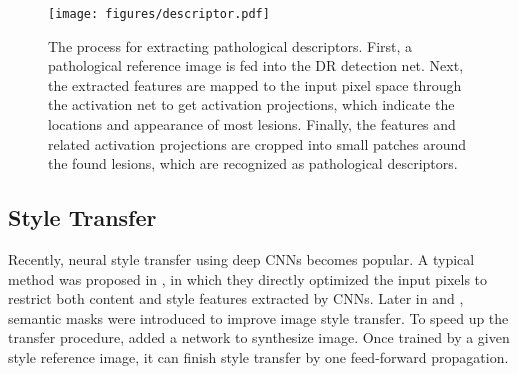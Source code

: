 \documentclass[letterpaper]{article} %
\begin{document}
    		\begin{figure*}[h!]
		\begin{center}
			\texttt{[image: figures/descriptor.pdf]}
		\end{center}
		\caption{The process for extracting pathological descriptors. First, a pathological reference image is fed into the DR detection net. Next, the extracted features are mapped to the input pixel space through the activation net to get activation projections, which indicate the locations and appearance of most lesions. Finally, the features and related activation projections are cropped into small patches around the found lesions, which are recognized as pathological descriptors. }
		\label{fig:descriptor}
	\end{figure*}



	\subsection{Style Transfer}
    Recently, neural style transfer using deep CNNs becomes popular. A typical method was proposed in \cite{DBLP:conf/cvpr/GatysEB16}, in which they directly optimized the input pixels to restrict both content and style features extracted by CNNs.
    Later in \cite{DBLP:conf/cvpr/LuanPSB17} and \cite{DBLP:conf/cvpr/GatysEBHS17}, semantic masks were introduced to improve image style transfer.
	To speed up the transfer procedure, \cite{DBLP:conf/eccv/JohnsonAF16} added a network to synthesize image. Once trained by a given style reference image, it can finish style transfer by one feed-forward propagation.
\end{document}
